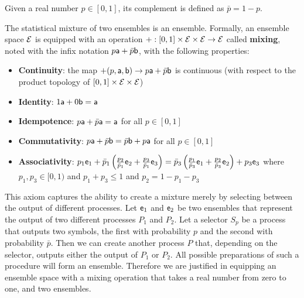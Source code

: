 \begin{mathSection}
\begin{defn}
	Given a real number $p \in [0,1]$, its complement is defined as $\bar{p} = 1-p$.
\end{defn}

\begin{axiom}\label{pm-es-axiomMixture}
	The statistical mixture of two ensembles is an ensemble. Formally, an ensemble space $\Ens$ is equipped with an operation $+ : [0, 1] \times \Ens \times \Ens \to \Ens$ called \textbf{mixing}, noted with the infix notation $p \ens[a] + \bar{p} \ens[b]$, with the following properties:
	\begin{itemize}
		\item \textbf{Continuity}: the map $+(p, \ens[a], \ens[b])  \to p \ens[a] + \bar{p} \ens[b]$ is continuous (with respect to the product topology of $[0, 1] \times \Ens \times \Ens$)
		\item \textbf{Identity}: $1 \ens[a] + 0 \ens[b] = \ens[a]$
		\item \textbf{Idempotence}:  $p \ens[a] + \bar{p} \ens[a] = \ens[a]$ for all $p \in [0,1]$
		\item \textbf{Commutativity}: $p \ens[a] + \bar{p} \ens[b] = \bar{p} \ens[b] + p \ens[a]$ for all $p \in [0,1]$
		\item \textbf{Associativity}: $p_1 \ens_1 + \bar{p}_1\left(\frac{p_2}{\bar{p}_1}\ens_2 + \frac{p_3}{\bar{p}_1}\ens_3\right) =  \bar{p}_3\left(\frac{p_1}{\bar{p}_3} \ens_1 +  \frac{p_2}{\bar{p}_3}\ens_2\right) + p_3 \ens_3$ where $p_1, p_3 \in [0,1)$ and $p_1 + p_3 \leq 1$ and $p_2 = 1 - p_1 - p_3$
	\end{itemize}
\end{axiom}

\begin{justification}
	This axiom captures the ability to create a mixture merely by selecting between the output of different processes. Let $\ens_1$ and $\ens_2$ be two ensembles that represent the output of two different processes $P_1$ and $P_2$. Let a selector $S_p$ be a process that outputs two symbols, the first with probability $p$ and the second with probability $\bar{p}$. Then we can create another process $P$ that, depending on the selector, outputs either the output of $P_1$ or $P_2$. All possible preparations of such a procedure will form an ensemble. Therefore we are justified in equipping an ensemble space with a mixing operation that takes a real number from zero to one, and two ensembles.
	

\end{justification}
\end{mathSection}
